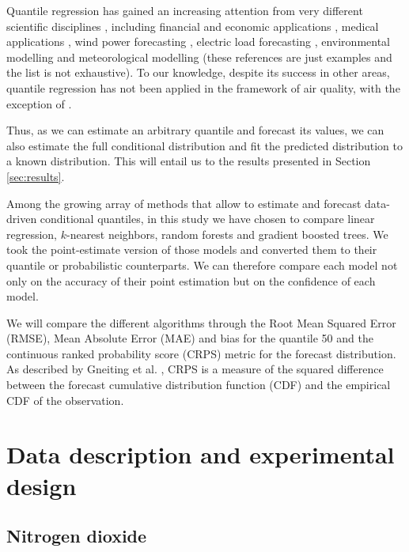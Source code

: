 \documentclass[a4paper,3p,sort&compress]{elsarticle}
\begin{document}
Quantile regression has gained an increasing attention from very
different scientific disciplines \cite{yu_quantile_2003}, including
financial and economic applications \cite{ben_rejeb_financial_2016},
medical applications \cite{jang_quantile_2018}, wind power forecasting
\cite{wan_direct_2017}, electric load forecasting
\cite{lebotsa_short_2018}, environmental modelling
\cite{cade_gentle_2003} and meteorological modelling
\cite{baur_modelling_2004} (these references are just examples and the
list is not exhaustive). To our knowledge, despite its success in
other areas, quantile regression has not been applied in the framework
of air quality, with the exception of
\cite{martinezsilva_forecasting_2016}.

Thus, as we can estimate an arbitrary quantile and forecast its
values, we can also estimate the full conditional distribution and fit 
the predicted distribution to a known distribution. This
will entail us to the results presented in Section \ref{sec:results}.

Among the growing array of methods that allow to estimate and forecast
data-driven conditional quantiles, in this study we have chosen to
compare linear regression, $k$-nearest neighbors, random forests and
gradient boosted trees. We took the point-estimate version of those
models and converted them to their quantile or probabilistic
counterparts. We can therefore compare each model not only on the
accuracy of their point estimation but on the confidence of each
model.

We will compare the different algorithms through the Root Mean Squared Error (RMSE), 
Mean Absolute Error (MAE) and
bias for the quantile 50 and the continuous ranked probability score
 (CRPS) metric for the forecast
distribution.  As described by Gneiting et
al. \cite{gneiting_probabilistic_2014}, CRPS is a measure of the
squared difference between the forecast cumulative distribution
function (CDF) and the empirical CDF of the observation.

\section{Data description and experimental design}

\subsection{Nitrogen dioxide}
\label{sec:no2}
\end{document}
